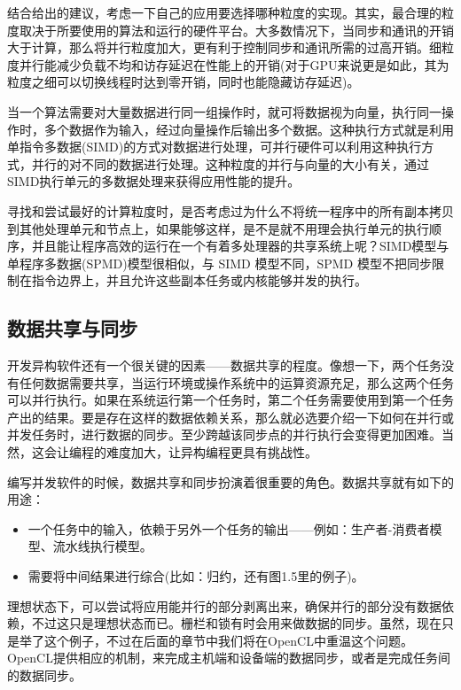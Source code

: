 结合给出的建议，考虑一下自己的应用要选择哪种粒度的实现。其实，最合理的粒度取决于所要使用的算法和运行的硬件平台。大多数情况下，当同步和通讯的开销大于计算，那么将并行粒度加大，更有利于控制同步和通讯所需的过高开销。细粒度并行能减少负载不均和访存延迟在性能上的开销(对于GPU来说更是如此，其为粒度之细可以切换线程时达到零开销，同时也能隐藏访存延迟)。

当一个算法需要对大量数据进行同一组操作时，就可将数据视为向量，执行同一操作时，多个数据作为输入，经过向量操作后输出多个数据。这种执行方式就是利用单指令多数据(SIMD)的方式对数据进行处理，可并行硬件可以利用这种执行方式，并行的对不同的数据进行处理。这种粒度的并行与向量的大小有关，通过SIMD执行单元的多数据处理来获得应用性能的提升。

寻找和尝试最好的计算粒度时，是否考虑过为什么不将统一程序中的所有副本拷贝到其他处理单元和节点上，如果能够这样，是不是就不用理会执行单元的执行顺序，并且能让程序高效的运行在一个有着多处理器的共享系统上呢？SIMD模型与单程序多数据(SPMD)模型很相似，与 SIMD 模型不同，SPMD 模型不把同步限制在指令边界上，并且允许这些副本任务或内核能够并发的执行。

\subsection{数据共享与同步}

开发异构软件还有一个很关键的因素——数据共享的程度。像想一下，两个任务没有任何数据需要共享，当运行环境或操作系统中的运算资源充足，那么这两个任务可以并行执行。如果在系统运行第一个任务时，第二个任务需要使用到第一个任务产出的结果。要是存在这样的数据依赖关系，那么就必选要介绍一下如何在并行或并发任务时，进行数据的同步。至少跨越该同步点的并行执行会变得更加困难。当然，这会让编程的难度加大，让异构编程更具有挑战性。

编写并发软件的时候，数据共享和同步扮演着很重要的角色。数据共享就有如下的用途：

\begin{itemize}
\item 一个任务中的输入，依赖于另外一个任务的输出——例如：生产者-消费者模型、流水线执行模型。
\item 需要将中间结果进行综合(比如：归约，还有图1.5里的例子)。
\end{itemize}

理想状态下，可以尝试将应用能并行的部分剥离出来，确保并行的部分没有数据依赖，不过这只是理想状态而已。栅栏和锁有时会用来做数据的同步。虽然，现在只是举了这个例子，不过在后面的章节中我们将在OpenCL中重温这个问题。OpenCL提供相应的机制，来完成主机端和设备端的数据同步，或者是完成任务间的数据同步。

